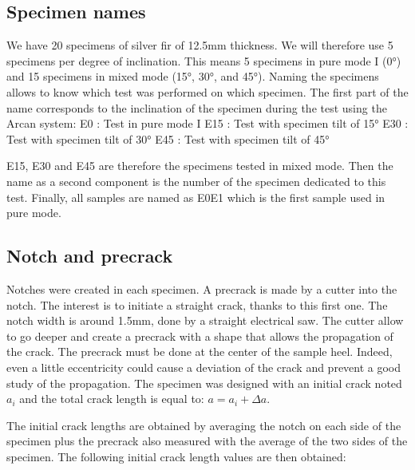 \subsection{Specimen names}

We have 20 specimens of silver fir of 12.5mm thickness.
We will therefore use 5 specimens per degree of inclination. This means 5 specimens in pure mode I (0°) and 15 specimens in mixed mode (15°, 30°, and 45°).
Naming the specimens allows to know which test was performed on which specimen. The first part of the name corresponds to the inclination of the specimen during the test using the Arcan system:
\newline
E0 : Test in pure mode I
\newline
E15 : Test with specimen tilt of 15°
\newline
E30 : Test with specimen tilt of 30°
\newline
E45 : Test with specimen tilt of 45°


E15, E30 and E45 are therefore the specimens tested in mixed mode.
Then the name as a second component is the number of the specimen dedicated to this test.
Finally, all samples are named as E0E1 which is the first sample used in pure mode.

\subsection{Notch and precrack}

Notches were created in each specimen. A precrack is made by a cutter into the notch. The interest is to initiate a straight crack, thanks to this first one. The notch width is around 1.5mm, done by a straight electrical saw. The cutter allow to go deeper and create a precrack with a shape that allows the propagation of the crack. The precrack must be done at the center of the sample heel. Indeed, even a little eccentricity could cause a deviation of the crack and prevent a good study of the propagation. The specimen was designed with an initial crack noted $a_i$ and the total crack length is equal to: $a=a_i+\Delta a$.

The initial crack lengths are obtained by averaging the notch on each side of the specimen plus the precrack also measured with the average of the two sides of the specimen.
The following initial crack length values are then obtained:

